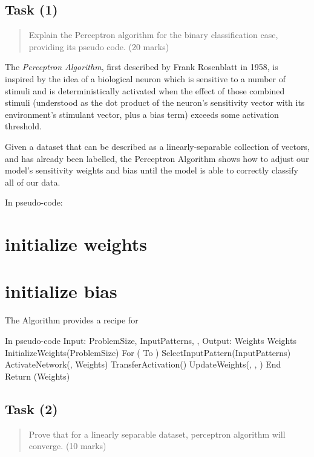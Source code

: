 \documentclass[11pt]{article}
\begin{document}
    \hypertarget{task-1}{%
\subsection{Task (1)}\label{task-1}}

\begin{quote}
Explain the Perceptron algorithm for the binary classification case,
providing its pseudo code. (20 marks)
\end{quote}

    The \emph{Perceptron Algorithm}, first described by Frank Rosenblatt in
1958, is inspired by the idea of a biological neuron which is sensitive
to a number of stimuli and is deterministically activated when the
effect of those combined stimuli (understood as the dot product of the
neuron's sensitivity vector with its environment's stimulant vector,
plus a bias term) exceeds some activation threshold.

Given a dataset that can be described as a linearly-separable collection
of vectors, and has already been labelled, the Perceptron Algorithm
shows how to adjust our model's sensitivity weights and bias until the
model is able to correctly classify all of our data.

In pseudo-code:

\hypertarget{initialize-weights}{%
\section{initialize weights}\label{initialize-weights}}

\hypertarget{initialize-bias}{%
\section{initialize bias}\label{initialize-bias}}

The Algorithm provides a recipe for

In pseudo-code Input: ProblemSize, InputPatterns, , Output: Weights
Weights InitializeWeights(ProblemSize) For ( To )
SelectInputPattern(InputPatterns) ActivateNetwork(, Weights)
TransferActivation() UpdateWeights(, , ) End Return (Weights)

    \hypertarget{task-2}{%
\subsection{Task (2)}\label{task-2}}

\begin{quote}
Prove that for a linearly separable dataset, perceptron algorithm will
converge. (10 marks)
\end{quote}
\end{document}
